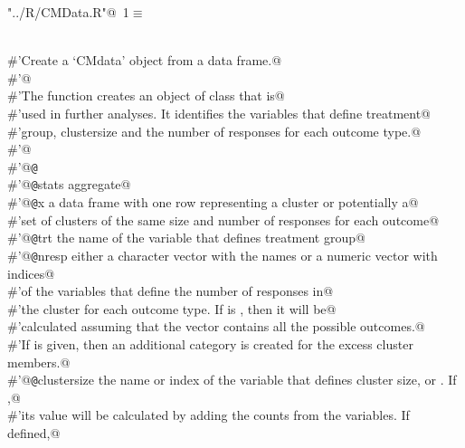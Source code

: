 \documentclass[reqno]{amsart}
\renewcommand{\NWtarget}[2]{\hypertarget{#1}{#2}}
\begin{document}
\begin{flushleft} \small\label{scrap1}\raggedright\small
\NWtarget{nuweb1}{} \verb@"../R/CMData.R"@\nobreak\ {\footnotesize {1}}$\equiv$
\vspace{-1ex}
\begin{list}{}{} \item
\mbox{}\verb@@\\
\mbox{}\verb@#'Create a `CMdata' object from a data frame.@\\
\mbox{}\verb@#'@\\
\mbox{}\verb@#'The  function creates an object of class  that is@\\
\mbox{}\verb@#'used in further analyses. It identifies the variables that define treatment@\\
\mbox{}\verb@#'group, clustersize and the number of responses for each outcome type.@\\
\mbox{}\verb@#'@\\
\mbox{}\verb@#'@{\tt @}\verb@export@\\
\mbox{}\verb@#'@{\tt @}\verb@importFrom stats aggregate@\\
\mbox{}\verb@#'@{\tt @}\verb@param x a data frame with one row representing a cluster or potentially a@\\
\mbox{}\verb@#'set of clusters of the same size and number of responses for each outcome@\\
\mbox{}\verb@#'@{\tt @}\verb@param trt the name of the variable that defines treatment group@\\
\mbox{}\verb@#'@{\tt @}\verb@param nresp either a character vector with the names or a numeric vector with indices@\\
\mbox{}\verb@#'of the variables that define the number of responses in@\\
\mbox{}\verb@#'the cluster for each outcome type. If  is , then it will be@\\
\mbox{}\verb@#'calculated assuming that the  vector contains all the possible outcomes.@\\
\mbox{}\verb@#'If  is given, then an additional category is created for the excess cluster members.@\\
\mbox{}\verb@#'@{\tt @}\verb@param clustersize the name or index of the variable that defines cluster size, or . If ,@\\
\mbox{}\verb@#'its value will be calculated by adding the counts from the  variables. If defined,@\\

\end{list}
\end{flushleft}
\end{document}
